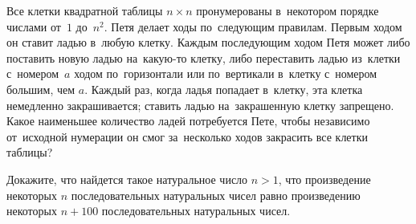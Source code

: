 \begin{problems}
\item
Все клетки квадратной таблицы $n \times n$ пронумерованы в~некотором порядке
числами от~$1$ до~$n^2$.
Петя делает ходы по~следующим правилам.
Первым ходом он ставит ладью в~любую клетку.
Каждым последующим ходом Петя может либо поставить новую ладью на~какую-то
клетку, либо переставить ладью из~клетки с~номером~$a$ ходом по~горизонтали или
по~вертикали в~клетку с~номером большим, чем $a$.
Каждый раз, когда ладья попадает в~клетку, эта клетка немедленно закрашивается;
ставить ладью на~закрашенную клетку запрещено.
Какое наименьшее количество ладей потребуется Пете, чтобы независимо
от~исходной нумерации он смог за~несколько ходов закрасить все клетки таблицы?

\item
Докажите, что найдется такое натуральное число $n > 1$, что произведение
некоторых $n$ последовательных натуральных чисел равно произведению
некоторых $n + 100$ последовательных натуральных чисел.

\end{problems}


